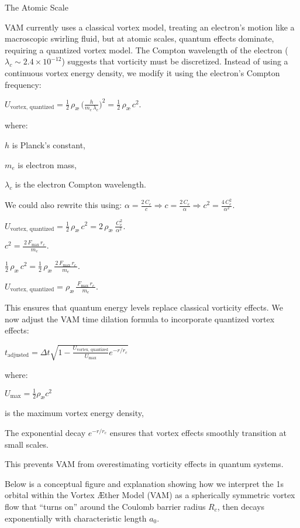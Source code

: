 The Atomic Scale

VAM currently uses a classical vortex model, treating an electron’s motion like a macroscopic swirling fluid, but at atomic scales, quantum effects dominate, requiring a quantized vortex model. The Compton wavelength of the electron ($\lambda_c \sim 2.4 \times 10^{-12}$) suggests that vorticity must be discretized. Instead of using a continuous vortex energy density, we modify it using the electron's Compton frequency:

$U_{\text{vortex, quantized}}= \tfrac12\,\rho_\text{\ae}\,\bigl(\tfrac{h}{m_e\,\lambda_c}\bigr)^2= \tfrac12\,\rho_\text{\ae}\,c^2.$

where:

$h$ is Planck’s constant,

$m_e$ is electron mass,

$\lambda_c$ is the electron Compton wavelength.

We could also rewrite this using: 
$\alpha= \tfrac{2\,C_e}{c}\Rightarrow c= \tfrac{2\,C_e}{\alpha}\Rightarrow c^2= \tfrac{4\,C_e^{2}}{\alpha^{2}}.$

$U_\text{vortex, quantized}= \tfrac12\,\rho_\text{\ae}\,c^2= 2\,\rho_\text{\ae}\,\frac{\,C_e^{2}}{\alpha^{2}}.$

$c^2= \frac{\,2\,F_{\max}\,r_c\,}{\,m_{e}\,}.$

$ \tfrac12\,\rho_\text{\ae}\,c^2= \tfrac12\,\rho_\text{\ae}\,\frac{\,2\,F_{\max}\,r_c\,}{\,m_{e}\,}.$

$U_{\text{vortex, quantized}}= \rho_\text{\ae}\,\frac{\,F_{\max}\,r_c\,}{\,m_{e}\,}.$

This ensures that quantum energy levels replace classical vorticity effects. We now adjust the VAM time dilation formula to incorporate quantized vortex effects:

$\boxed{t_{\text{adjusted}} = \Delta t \sqrt{1 - \frac{U_{\text{vortex, quantized}}}{U_{\text{max}}} e^{-r/r_c}}}$

where:

$U_{\text{max}} = \frac{1}{2} \rho_\text{\ae} c^2$ 

is the maximum vortex energy density,

The exponential decay $e^{-r/r_c}$ ensures that vortex effects smoothly transition at small scales.

This prevents VAM from overestimating vorticity effects in quantum systems.

Below is a conceptual figure and explanation showing how we interpret the 1s orbital within the Vortex Æther Model (VAM) as a spherically symmetric vortex flow that “turns on” around the Coulomb barrier radius \(R_c\), then decays exponentially with characteristic length \(a_0\).





